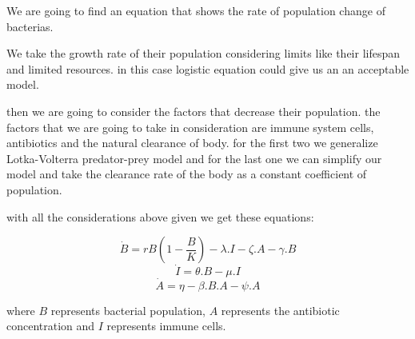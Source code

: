 
	We are going to find an equation that shows the rate of population change of bacterias.
	
	We take the growth rate of their population considering limits like their lifespan and limited resources. in this case logistic equation could give us an an acceptable model.
	
	then we are going to consider the factors that decrease their population. the factors that we are going to take in consideration are immune system cells, antibiotics and the natural clearance of body. for the first two we generalize Lotka-Volterra predator-prey model and for the last one we can simplify our model and take the clearance rate of the body as a constant coefficient of population.
	
	with all the considerations above given we get these equations:
	
	$$\dot B=rB(1-\frac{B}{K})-\lambda.I-\zeta.A-\gamma.B$$
	$$\dot I=\theta.B-\mu.I$$
	$$\dot A=\eta-\beta.B.A - \psi.A$$

    where $B$ represents bacterial population, $A$ represents the antibiotic concentration and $I$ represents immune cells.
